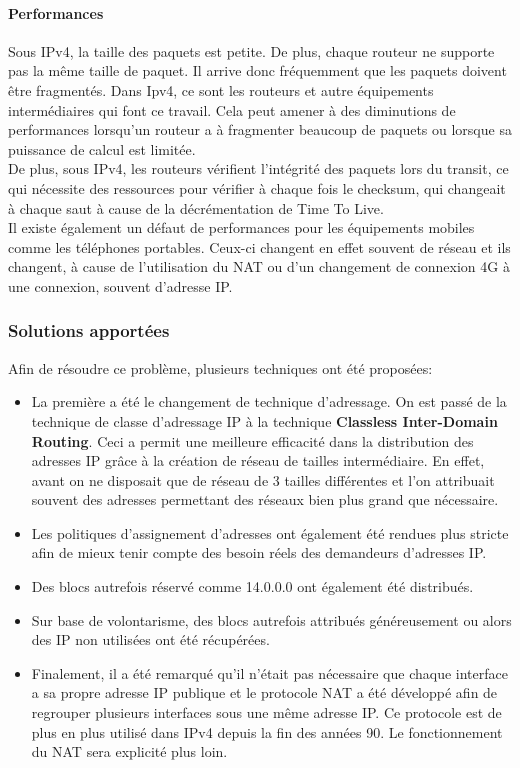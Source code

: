 \paragraph{Performances}
Sous IPv4, la taille des paquets est petite. De plus, chaque routeur ne supporte pas la même taille
de paquet. Il arrive donc fréquemment que les paquets doivent être fragmentés. Dans Ipv4, ce sont les 
routeurs et autre équipements intermédiaires qui font ce travail. Cela peut amener à
des diminutions de performances lorsqu'un routeur a à fragmenter beaucoup de paquets ou
lorsque sa puissance de calcul est limitée. 
\\
De plus, sous IPv4, les routeurs vérifient l'intégrité des paquets lors du transit, ce qui nécessite 
des ressources pour vérifier à chaque fois le checksum, qui changeait à chaque saut à cause
de la décrémentation de Time To Live.
\\
Il existe également un défaut de performances pour les équipements mobiles comme les téléphones 
portables. Ceux-ci changent en effet souvent de réseau et ils changent, à cause de 
l'utilisation du NAT ou d'un changement de connexion 4G à une connexion, souvent d'adresse IP. 
\\


\subsubsection{Solutions apportées}

Afin de résoudre ce problème, plusieurs techniques ont été proposées:
\begin{itemize}
\item La première a été le changement de technique d'adressage. On est passé de la
technique de classe d'adressage IP à la technique \textbf{Classless Inter-Domain
Routing}. Ceci a permit une meilleure efficacité dans la distribution des
adresses IP grâce à la création de réseau de tailles intermédiaire. En effet,
avant on ne disposait que de réseau de 3 tailles différentes et l'on attribuait
souvent des adresses permettant des réseaux bien plus grand que nécessaire.

\item Les politiques d'assignement d'adresses ont également été rendues plus stricte
afin de mieux tenir compte des besoin réels des demandeurs d'adresses IP.

\item Des blocs autrefois réservé comme 14.0.0.0 ont également été distribués.

\item Sur base de volontarisme, des blocs autrefois attribués généreusement ou alors
des IP non utilisées ont été récupérées.

\item Finalement, il a été remarqué qu'il n'était pas nécessaire que chaque interface
a sa propre adresse IP publique et le protocole NAT a été développé afin de regrouper
plusieurs interfaces sous une même adresse IP. Ce protocole est de plus en plus
utilisé dans IPv4 depuis la fin des années 90. Le fonctionnement du NAT sera explicité
plus loin.
\end{itemize}


